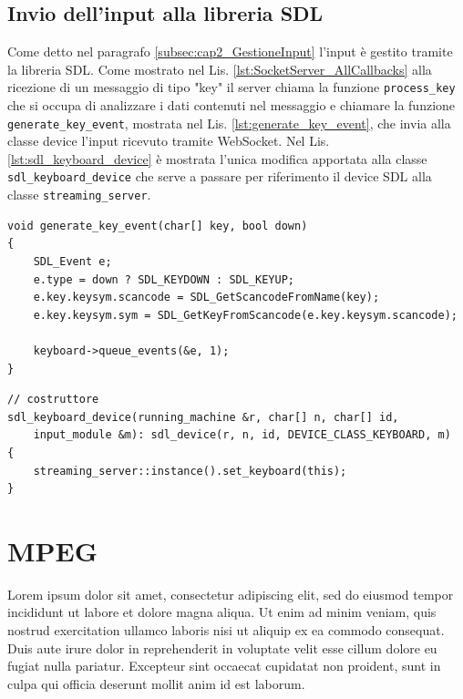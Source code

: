 \subsection{Invio dell'input alla libreria SDL}
Come detto nel paragrafo \ref{subsec:cap2_GestioneInput} l'input è gestito tramite la libreria SDL. Come mostrato nel Lis. \ref{lst:SocketServer_AllCallbacks} alla ricezione di un messaggio di tipo "key" il server chiama la funzione \verb|process_key| che si occupa di analizzare i dati contenuti nel messaggio e chiamare la funzione \verb|generate_key_event|, mostrata nel Lis. \ref{lst:generate_key_event}, che invia alla classe device l'input ricevuto tramite WebSocket. Nel Lis. \ref{lst:sdl_keyboard_device} è mostrata l'unica modifica apportata alla classe \verb|sdl_keyboard_device| che serve a passare per riferimento il device SDL alla classe \verb|streaming_server|.

\begin{lstlisting}[caption=Codice relativo alla gestione input lato server: modulo server, label={lst:generate_key_event}]
void generate_key_event(char[] key, bool down)
{
	SDL_Event e;
	e.type = down ? SDL_KEYDOWN : SDL_KEYUP;
	e.key.keysym.scancode = SDL_GetScancodeFromName(key);
	e.key.keysym.sym = SDL_GetKeyFromScancode(e.key.keysym.scancode);

	keyboard->queue_events(&e, 1);
}
\end{lstlisting}

\begin{lstlisting}[caption=Codice relativo alla gestione input lato server: modulo SDL, label={lst:sdl_keyboard_device}]
// costruttore
sdl_keyboard_device(running_machine &r, char[] n, char[] id,
	input_module &m): sdl_device(r, n, id, DEVICE_CLASS_KEYBOARD, m)
{
	streaming_server::instance().set_keyboard(this);
}
\end{lstlisting}
	
\section{MPEG} \label{sec:cap3_MPEG}
Lorem ipsum dolor sit amet, consectetur adipiscing elit, sed do eiusmod tempor incididunt ut labore et dolore magna aliqua. Ut enim ad minim veniam, quis nostrud exercitation ullamco laboris nisi ut aliquip ex ea commodo consequat. Duis aute irure dolor in reprehenderit in voluptate velit esse cillum dolore eu fugiat nulla pariatur. Excepteur sint occaecat cupidatat non proident, sunt in culpa qui officia deserunt mollit anim id est laborum.

